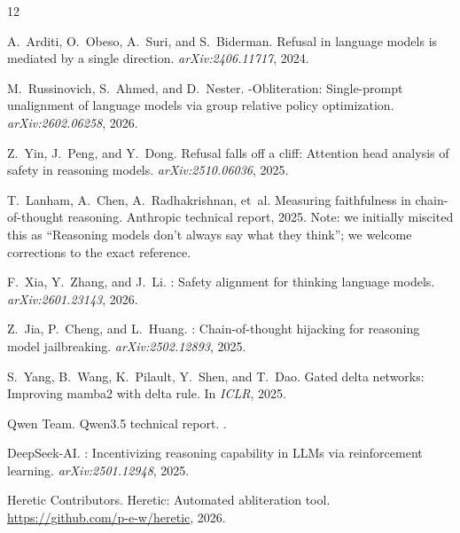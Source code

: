 \documentclass{article}
\begin{document}

\begin{thebibliography}{12}

A.~Arditi, O.~Obeso, A.~Suri, and S.~Biderman.
\newblock Refusal in language models is mediated by a single direction.
\newblock \emph{arXiv:2406.11717}, 2024.

M.~Russinovich, S.~Ahmed, and D.~Nester.
-Obliteration: Single-prompt unalignment of language models via group relative policy optimization.
\newblock \emph{arXiv:2602.06258}, 2026.

Z.~Yin, J.~Peng, and Y.~Dong.
\newblock Refusal falls off a cliff: Attention head analysis of safety in reasoning models.
\newblock \emph{arXiv:2510.06036}, 2025.

T.~Lanham, A.~Chen, A.~Radhakrishnan, et~al.
\newblock Measuring faithfulness in chain-of-thought reasoning.
\newblock Anthropic technical report, 2025.
\newblock Note: we initially miscited this as ``Reasoning models don't always say what they think''; we welcome corrections to the exact reference.

F.~Xia, Y.~Zhang, and J.~Li.
: Safety alignment for thinking language models.
\newblock \emph{arXiv:2601.23143}, 2026.

Z.~Jia, P.~Cheng, and L.~Huang.
: Chain-of-thought hijacking for reasoning model jailbreaking.
\newblock \emph{arXiv:2502.12893}, 2025.

S.~Yang, B.~Wang, K.~Pilault, Y.~Shen, and T.~Dao.
\newblock Gated delta networks: Improving mamba2 with delta rule.
\newblock In \emph{ICLR}, 2025.

{Qwen Team}.
\newblock Qwen3.5 technical report.
.

{DeepSeek-AI}.
: Incentivizing reasoning capability in {LLMs} via reinforcement learning.
\newblock \emph{arXiv:2501.12948}, 2025.

{Heretic Contributors}.
\newblock Heretic: Automated abliteration tool.
\newblock \url{https://github.com/p-e-w/heretic}, 2026.


\end{thebibliography}
\end{document}

